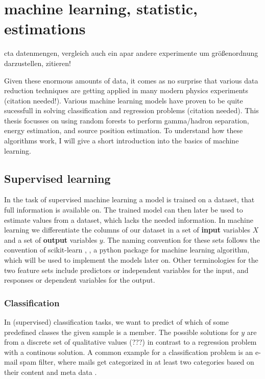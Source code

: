 \chapter{machine learning, statistic, estimations}\label{ml}

cta datenmengen, vergleich auch ein apar andere experimente um größenordnung darzustellen, zitieren!

Given these enormous amounts of data, it comes as no surprise that
various data reduction techniques are getting applied in many modern
physics experiments (citation needed!).
Various machine learning models have proven to be
quite sucessfull in solving classification and
regression problems (citation needed).
This thesis focusses on using random forests to
perform gamma/hadron separation, energy estimation, and
source position estimation.
To understand how these algorithms work, I will
give a short introduction into the basics of machine learning.

\section{Supervised learning}
In the task of supervised machine learning a model is trained on a
dataset, that full information is available on. The trained model
can then later be used to estimate values from a dataset, which
lacks the needed information. In machine learning we differentiate
the columns of our dataset in a set of \textbf{input} variables $X$ and
a set of \textbf{output} variables $y$. The naming convention for
these sets follows the convention of scikit-learn
\cite{scikit-learn}, \cite{sklearn_api}, a python package for
machine learning algorithm, which will be used to implement the models later on.
Other terminologies for the two feature sets include
predictors or independent variables for the input, and
responses or dependent variables for the output.

\subsection{Classification}
In (supervised) classification tasks, we want to predict of which of some 
predefined classes the given sample is a member. The possible solutions for $y$
are from a discrete set of qualitative values (???) in 
contrast to a regression problem with a continous solution.
A common example for a classification problem is an e-mail spam filter,
where mails get categorized in at least two categories based
on their content and meta data \cite{DBLP:journals/corr/cs-CL-0006013}.

